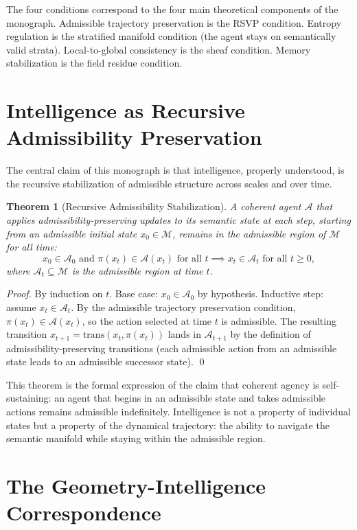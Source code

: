 \documentclass[12pt, a4paper, openany]{book}
\theoremstyle{plain}
\newtheorem{theorem}{Theorem}[chapter]
\theoremstyle{definition}
\theoremstyle{remark}
\newcommand{\Adm}{\mathcal{A}}
\begin{document}
The four conditions correspond to the four main theoretical components of the monograph. Admissible trajectory preservation is the RSVP condition. Entropy regulation is the stratified manifold condition (the agent stays on semantically valid strata). Local-to-global consistency is the sheaf condition. Memory stabilization is the field residue condition.

\section{Intelligence as Recursive Admissibility Preservation}

The central claim of this monograph is that intelligence, properly understood, is the recursive stabilization of admissible structure across scales and over time.

\begin{theorem}[Recursive Admissibility Stabilization]
A coherent agent $\mathcal{A}$ that applies admissibility-preserving updates to its semantic state at each step, starting from an admissible initial state $x_0 \in \mathcal{M}$, remains in the admissible region of $\mathcal{M}$ for all time:
\[
x_0 \in \Adm_0 \text{ and } \pi(x_t) \in \Adm(x_t) \text{ for all } t \implies x_t \in \Adm_t \text{ for all } t \geq 0,
\]
where $\Adm_t \subseteq \mathcal{M}$ is the admissible region at time $t$.
\end{theorem}

\begin{proof}
By induction on $t$. Base case: $x_0 \in \Adm_0$ by hypothesis. Inductive step: assume $x_t \in \Adm_t$. By the admissible trajectory preservation condition, $\pi(x_t) \in \Adm(x_t)$, so the action selected at time $t$ is admissible. The resulting transition $x_{t+1} = \mathrm{trans}(x_t, \pi(x_t))$ lands in $\Adm_{t+1}$ by the definition of admissibility-preserving transitions (each admissible action from an admissible state leads to an admissible successor state). \qed
\end{proof}

This theorem is the formal expression of the claim that coherent agency is self-sustaining: an agent that begins in an admissible state and takes admissible actions remains admissible indefinitely. Intelligence is not a property of individual states but a property of the dynamical trajectory: the ability to navigate the semantic manifold while staying within the admissible region.

\section{The Geometry-Intelligence Correspondence}
\end{document}

